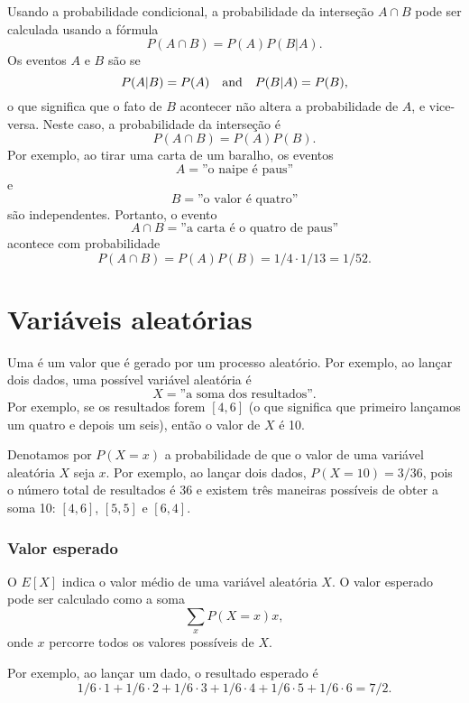 
Usando a probabilidade condicional,
a probabilidade da interseção
$A \cap B$ pode ser calculada usando a fórmula
\[P(A \cap B)=P(A)P(B|A).\]
Os eventos $A$ e $B$ são  se
\[P(A|B)=P(A) \hspace{10px}\textrm{and}\hspace{10px} P(B|A)=P(B),\]
o que significa que o fato de $B$ acontecer não
altera a probabilidade de $A$, e vice-versa.
Neste caso, a probabilidade da interseção é
\[P(A \cap B)=P(A)P(B).\]
Por exemplo, ao tirar uma carta de um baralho, os eventos
\[A = \textrm{''o naipe é paus''}\]
e
\[B = \textrm{''o valor é quatro''}\]
são independentes. Portanto, o evento
\[A \cap B = \textrm{''a carta é o quatro de paus''}\]
acontece com probabilidade
\[P(A \cap B)=P(A)P(B)=1/4 \cdot 1/13 = 1/52.\]

\section{Variáveis aleatórias}


Uma  é um valor que é gerado
por um processo aleatório.
Por exemplo, ao lançar dois dados,
uma possível variável aleatória é
\[X=\textrm{''a soma dos resultados''}.\]
Por exemplo, se os resultados forem $[4,6]$
(o que significa que primeiro lançamos um quatro e depois um seis),
então o valor de $X$ é 10.

Denotamos por $P(X=x)$ a probabilidade de que
o valor de uma variável aleatória $X$ seja $x$.
Por exemplo, ao lançar dois dados,
$P(X=10)=3/36$,
pois o número total de resultados é 36
e existem três maneiras possíveis de obter
a soma 10: $[4,6]$, $[5,5]$ e $[6,4]$.

\subsubsection{Valor esperado}


O  $E[X]$ indica o
valor médio de uma variável aleatória $X$.
O valor esperado pode ser calculado como a soma
\[\sum_x P(X=x)x,\]
onde $x$ percorre todos os valores possíveis de $X$.

Por exemplo, ao lançar um dado,
o resultado esperado é
\[1/6 \cdot 1 + 1/6 \cdot 2 + 1/6 \cdot 3 + 1/6 \cdot 4 + 1/6 \cdot 5 + 1/6 \cdot 6 = 7/2.\]


